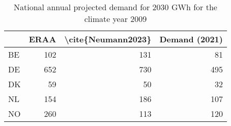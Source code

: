 \begin{table}
\centering
\caption{National annual projected demand for 2030  GWh for the climate year 2009}
\begin{tabular}{lrrr}
\toprule
{} &  ERAA &  \textbackslash cite\{Neumann2023\} &  Demand (2021) \\
\midrule
BE &   102 &                 131 &             81 \\
DE &   652 &                 730 &            495 \\
DK &    59 &                  50 &             32 \\
NL &   154 &                 186 &            107 \\
NO &   260 &                 113 &            120 \\
\bottomrule
\end{tabular}
\end{table}
